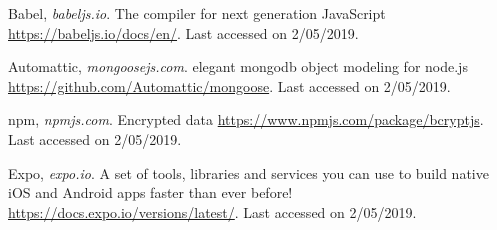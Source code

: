 \begin{thebibliography}{1}
\bibitem{[BABEL]} {\textlatin{
{Babel, {\em babeljs.io}}.
The compiler for next generation JavaScript
\url{https://babeljs.io/docs/en/}. Last accessed on 2/05/2019}}.


\bibitem{[MONGOOSE]} {\textlatin{
{Automattic, {\em mongoosejs.com}}.
elegant mongodb object modeling for node.js
\url{https://github.com/Automattic/mongoose}. Last accessed on 2/05/2019}}.


\bibitem{[BCRYPT]} {\textlatin{
{npm, {\em npmjs.com}}.
Encrypted data
\url{https://www.npmjs.com/package/bcryptjs}. Last accessed on 2/05/2019}}.

\bibitem{[EXPO]} {\textlatin{
{Expo, {\em expo.io}}.
A set of tools, libraries and services you can use to build native iOS and Android apps faster than ever before!
\url{https://docs.expo.io/versions/latest/}. Last accessed on 2/05/2019}}.









\end{thebibliography}